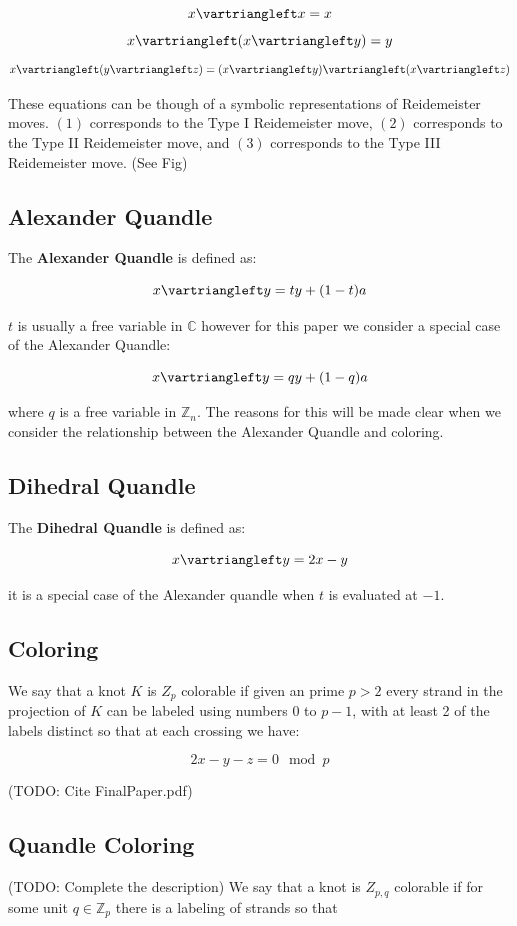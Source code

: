 \documentclass[paper.tex]{subfiles}
\begin{document}
\begin{equation}
	x \uc x = x
\end{equation}
\begin{equation}
	x \uc (x \uc y) = y \\
\end{equation}
\begin{equation}
	x \uc (y \uc z) = (x \uc y) \uc (x \uc z) \\
\end{equation}

These equations can be though of a symbolic representations of Reidemeister moves. $(1)$ corresponds to the Type I Reidemeister move, $(2)$ corresponds to the Type II Reidemeister move, and $(3)$ corresponds to the Type III Reidemeister move. (See Fig)

\subsection{Alexander Quandle}

The \textbf{Alexander Quandle} is defined as:

$$ x \uc y = ty + (1 - t)a $$

$t$ is usually a free variable in $\mathbb{C}$ however for this paper we consider a special case of the Alexander Quandle:

$$ x \uc y = qy + (1 - q)a $$

where $q$ is a free variable in $\mathbb{Z}_n$. The reasons for this will be made clear when we consider the relationship between the Alexander Quandle and coloring.

\subsection{Dihedral Quandle}
The \textbf{Dihedral Quandle} is defined as:

$$x\uc y = 2x - y$$

it is a special case of the Alexander quandle when $t$ is evaluated at $-1$.

\subsection{Coloring}

We say that a knot $K$ is $Z_p$ colorable if given an prime $p > 2$ every strand in the projection of $K$ can be labeled using numbers $0$ to $p-1$, with at least 2 of the labels distinct so that at each crossing we have:

$$ 2x - y - z = 0 \mod p $$

(TODO: Cite FinalPaper.pdf)

\subsection{Quandle Coloring}

(TODO: Complete the description)
We say that a knot is $Z_{p,q}$ colorable if for some unit $q \in \mathbb{Z}_p$ there is a labeling of strands so that
\end{document}
